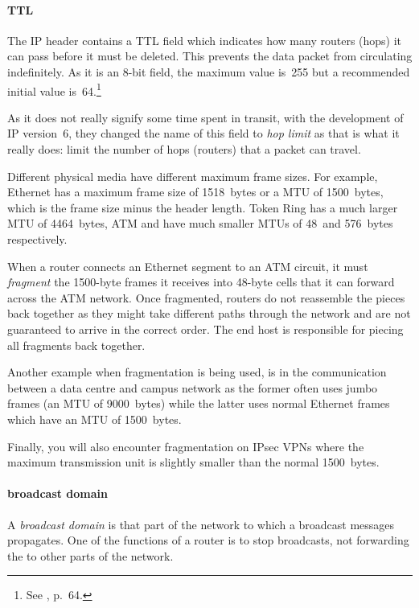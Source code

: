 \paragraph{\acl{TTL}}
\label{par:ip-ttl}
The \acs{IP} header contains a \gls{TTL} field which indicates how many routers (hops) it can pass before it must be deleted.
This prevents the data packet from circulating indefinitely.
As it is an 8-bit field, the maximum value is~255 but a recommended initial value is~64.\footnote{See , p.~64.}

As it does not really signify some time spent in transit, with the development of \acs{IP} version~6, they changed the name of this field to \emph{hop limit} as that is what it really does: limit the number of hops (routers) that a packet can travel.


\label{par:ip-fragmentation}
Different physical media have different maximum frame sizes.
For example, Ethernet has a maximum frame size of 1518~bytes or a \gls{MTU} of 1500~bytes, which is the frame size minus the header length.
Token Ring has a much larger \gls{MTU} of 4464~bytes, \gls{ATM} and  have much smaller \acp{MTU} of 48~and 576~bytes respectively.

When a router connects an Ethernet segment to an \gls{ATM} circuit, it must \emph{fragment} the 1500-byte frames it receives into 48-byte cells that it can forward across the \ac{ATM} network.
Once fragmented, routers do not reassemble the pieces back together as they might take different paths through the network and are not guaranteed to arrive in the correct order.
The end host is responsible for piecing all fragments back together.

Another example when fragmentation is being used, is in the communication between a data centre and campus network as the former often uses jumbo frames (an \acs{MTU} of 9000~bytes) while the latter uses normal Ethernet frames which have an \acs{MTU} of 1500~bytes.%

Finally, you will also encounter fragmentation on IPsec \aclp{VPN} where the maximum transmission unit is slightly smaller than the normal 1500~bytes.

\paragraph{broadcast domain}
A \emph{broadcast domain} is that part of the network to which a broadcast messages propagates.
One of the functions of a router is to stop broadcasts, not forwarding the to other parts of the network.


